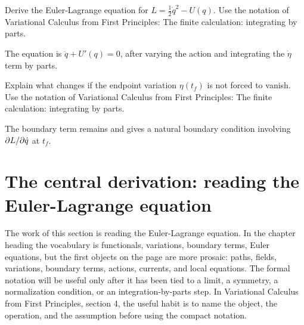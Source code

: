 \begin{exercise}
Derive the Euler-Lagrange equation for \(L=\frac12\dot q^2-U(q)\).  Use the notation of Variational Calculus from First Principles: The finite calculation: integrating by parts.
\begin{answer}
The equation is \(\ddot q+U'(q)=0\), after varying the action and integrating the \(\dot\eta\) term by parts.
\end{answer}
\end{exercise}

\begin{exercise}
Explain what changes if the endpoint variation \(\eta(t_f)\) is not forced to vanish.  Use the notation of Variational Calculus from First Principles: The finite calculation: integrating by parts.
\begin{answer}
The boundary term remains and gives a natural boundary condition involving \(\partial L/\partial\dot q\) at \(t_f\).
\end{answer}
\end{exercise}



\section{The central derivation: reading the Euler-Lagrange equation}













The work of this section is reading the Euler-Lagrange equation.  In the chapter heading the vocabulary is functionals, variations, boundary terms, Euler equations, but the first objects on the page are more prosaic: paths, fields, variations, boundary terms, actions, currents, and local equations.  The formal notation will be useful only after it has been tied to a limit, a symmetry, a normalization condition, or an integration-by-parts step.  In Variational Calculus from First Principles, section 4, the useful habit is to name the object, the operation, and the assumption before using the compact notation.


